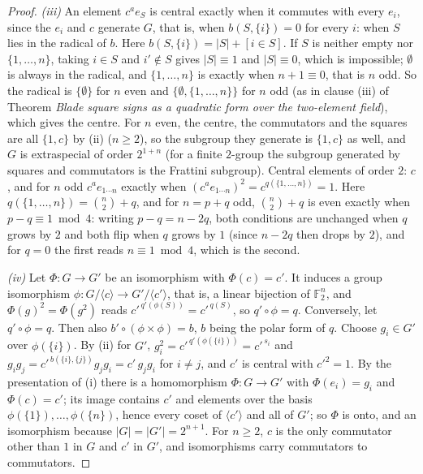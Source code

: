 \documentclass[11pt]{article}
\theoremstyle{definition}
\theoremstyle{plain}
\begin{document}
\begin{proof}
\emph{(iii)} An element $c^{a}e_{S}$ is central exactly when it commutes with every $e_{i}$, since the $e_{i}$ and $c$ generate $G$, that is, when $b(S, \{i\}) = 0$ for every $i$: when $S$ lies in the radical of $b$. Here $b(S, \{i\}) = |S| + [i \in S]$. If $S$ is neither empty nor $\{1, \dots, n\}$, taking $i \in S$ and $i' \notin S$ gives $|S| \equiv 1$ and $|S| \equiv 0$, which is impossible; $\emptyset$ is always in the radical, and $\{1, \dots, n\}$ is exactly when $n + 1 \equiv 0$, that is $n$ odd. So the radical is $\{\emptyset\}$ for $n$ even and $\{\emptyset, \{1, \dots, n\}\}$ for $n$ odd (as in clause (iii) of Theorem \emph{Blade square signs as a quadratic form over the two-element field}), which gives the centre. For $n$ even, the centre, the commutators and the squares are all $\{1, c\}$ by (ii) ($n \ge 2$), so the subgroup they generate is $\{1, c\}$ as well, and $G$ is extraspecial of order $2^{1+n}$ (for a finite $2$-group the subgroup generated by squares and commutators is the Frattini subgroup). Central elements of order $2$: $c$, and for $n$ odd $c^{a}e_{1 \cdots n}$ exactly when $(c^{a}e_{1 \cdots n})^{2} = c^{q(\{1, \dots, n\})} = 1$. Here $q(\{1, \dots, n\}) = \binom{n}{2} + q$, and for $n = p + q$ odd, $\binom{n}{2} + q$ is even exactly when $p - q \equiv 1 \bmod 4$: writing $p - q = n - 2q$, both conditions are unchanged when $q$ grows by $2$ and both flip when $q$ grows by $1$ (since $n - 2q$ then drops by $2$), and for $q = 0$ the first reads $n \equiv 1 \bmod 4$, which is the second.

\emph{(iv)} Let $\Phi : G \to G'$ be an isomorphism with $\Phi(c) = c'$. It induces a group isomorphism $\phi : G/\langle c\rangle \to G'/\langle c'\rangle$, that is, a linear bijection of $\mathbb{F}_{2}^{n}$, and $\Phi(g)^{2} = \Phi(g^{2})$ reads $c'^{\,q'(\phi(S))} = c'^{\,q(S)}$, so $q' \circ \phi = q$. Conversely, let $q' \circ \phi = q$. Then also $b' \circ (\phi \times \phi) = b$, $b$ being the polar form of $q$. Choose $g_{i} \in G'$ over $\phi(\{i\})$. By (ii) for $G'$, $g_{i}^{2} = c'^{\,q'(\phi(\{i\}))} = c'^{\,s_{i}}$ and $g_{i}g_{j} = c'^{\,b(\{i\}, \{j\})}g_{j}g_{i} = c'\,g_{j}g_{i}$ for $i \ne j$, and $c'$ is central with $c'^{2} = 1$. By the presentation of (i) there is a homomorphism $\Phi : G \to G'$ with $\Phi(e_{i}) = g_{i}$ and $\Phi(c) = c'$; its image contains $c'$ and elements over the basis $\phi(\{1\}), \dots, \phi(\{n\})$, hence every coset of $\langle c'\rangle$ and all of $G'$; so $\Phi$ is onto, and an isomorphism because $|G| = |G'| = 2^{n+1}$. For $n \ge 2$, $c$ is the only commutator other than $1$ in $G$ and $c'$ in $G'$, and isomorphisms carry commutators to commutators.


\end{proof}
\end{document}

